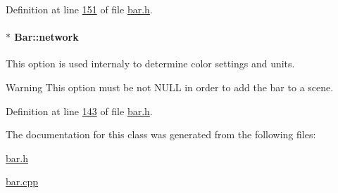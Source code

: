 Definition at line \hyperlink{bar_8h_source_l00151}{151} of file \hyperlink{bar_8h_source}{bar.\+h}.

\hypertarget{class_bar_a80025f13884750add58cc61b318357ff}{}
\paragraph[{network}]{$\ast$ Bar\+::network}\label{class_bar_a80025f13884750add58cc61b318357ff}
This option is used internaly to determine color settings and units. \begin{DoxyWarning}{Warning}
This option must be not N\+U\+L\+L in order to add the bar to a scene. 
\end{DoxyWarning}


Definition at line \hyperlink{bar_8h_source_l00143}{143} of file \hyperlink{bar_8h_source}{bar.\+h}.



The documentation for this class was generated from the following files\+:\begin{DoxyCompactItemize}
\item 
\hyperlink{bar_8h}{bar.\+h}\item 
\hyperlink{bar_8cpp}{bar.\+cpp}\end{DoxyCompactItemize}
